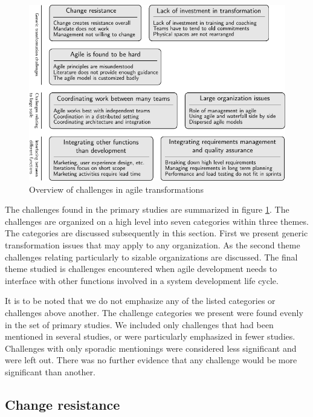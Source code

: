 \begin{figure}[!b]
  \begin{center}
    \includegraphics{graphics/challenges_summary.pdf}
    \caption{Overview of challenges in agile transformations}
    \label{fig:challenges_summary}
  \end{center}
\end{figure}

The challenges found in the primary studies are summarized in figure
\ref{fig:challenges_summary}. The challenges are organized on a high level into
seven categories within three themes. The categories are discussed subsequently
in this section. First we present generic transformation issues that may apply
to any organization. As the second theme challenges relating particularly to
sizable organizations are discussed. The final theme studied is challenges
encountered when agile development needs to interface with other functions
involved in a system development life cycle.

It is to be noted that we do not emphasize any of the listed categories or
challenges above another. The challenge categories we present were found evenly
in the set of primary studies. We included only challenges that had been
mentioned in several studies, or were particularly emphasized in fewer studies.
Challenges with only sporadic mentionings were considered less significant and
were left out. There was no further evidence that any challenge would be more
significant than another.


\subsection{Change resistance}

